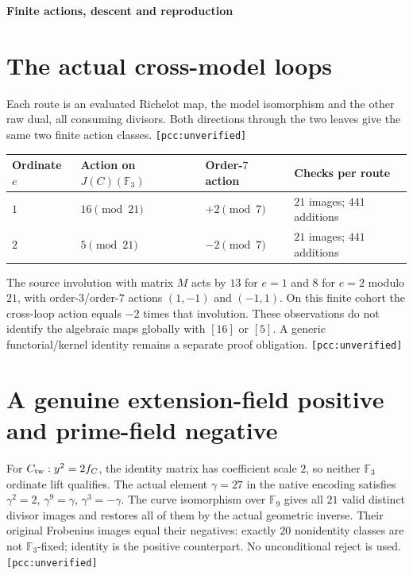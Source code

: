 \documentclass[10pt,a4paper]{article}
\newcommand{\uv}{\texttt{[pcc:unverified]}}
\begin{document}
\newpage
{\Large\bfseries Finite actions, descent and reproduction}\par

\section{The actual cross-model loops}
Each route is an evaluated Richelot map, the model isomorphism and the
other raw dual, all consuming divisors. Both directions through the two
leaves give the same two finite action classes. \uv

\begin{center}\begin{tabular}{@{}llll@{}}
\toprule
Ordinate $e$ & Action on $J(C)(\mathbb F_3)$ & Order-$7$ action & Checks per route\\\midrule
$1$ & $16\pmod{21}$ & $+2\pmod7$ & $21$ images; $441$ additions\\
$2$ & $5\pmod{21}$ & $-2\pmod7$ & $21$ images; $441$ additions\\
\bottomrule\end{tabular}\end{center}

The source involution with matrix $M$ acts by $13$ for $e=1$ and $8$
for $e=2$ modulo $21$, with order-$3$/order-$7$ actions $(1,-1)$ and
$(-1,1)$. On this finite cohort the cross-loop action equals $-2$ times
that involution. These observations do not identify the algebraic maps
globally with $[16]$ or $[5]$. A generic functorial/kernel identity remains
a separate proof obligation. \uv

\section{A genuine extension-field positive and prime-field negative}
For $C_{\rm tw}:y^2=2f_C$, the identity matrix has coefficient scale $2$,
so neither $\mathbb F_3$ ordinate lift qualifies. The actual element
$\gamma=27$ in the native encoding satisfies
$\gamma^2=2$, $\gamma^9=\gamma$, $\gamma^3=-\gamma$.
The curve isomorphism over $\mathbb F_9$ gives all $21$ valid distinct
divisor images and restores all of them by the actual geometric inverse.
Their original Frobenius images equal their negatives: exactly $20$
nonidentity classes are not $\mathbb F_3$-fixed; identity is the positive
counterpart. No unconditional reject is used. \uv
\end{document}
